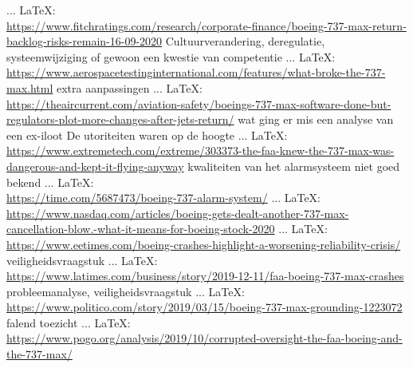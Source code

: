{{\cite{reenberg787flaws}
 ... \LaTeX:\\ \url{https://www.fitchratings.com/research/corporate-finance/boeing-737-max-return-backlog-risks-remain-16-09-2020}
\cite{fitch16092020737backlogrisks}
Cultuurverandering, deregulatie, systeemwijziging of gewoon een kwestie van competentie
 ... \LaTeX:\\ \url{https://www.aerospacetestinginternational.com/features/what-broke-the-737-max.html}
\cite{willis27082020737maxfailures}
extra aanpassingen
 ... \LaTeX:\\ \url{https://theaircurrent.com/aviation-safety/boeings-737-max-software-done-but-regulators-plot-more-changes-after-jets-return/}
\cite{ostrower11062020more737changes}
wat ging er mis een analyse van een ex-iloot
De utoriteiten waren op de hoogte
 ... \LaTeX:\\ \url{https://www.extremetech.com/extreme/303373-the-faa-knew-the-737-max-was-dangerous-and-kept-it-flying-anyway}
\cite{hruska13122019faaknown737crashrate}
kwaliteiten van het alarmsysteem niet goed bekend
 ... \LaTeX:\\ \url{https://time.com/5687473/boeing-737-alarm-system/}
\cite{bloomberg26092019failedpred}
 ... \LaTeX:\\ \url{https://www.nasdaq.com/articles/boeing-gets-dealt-another-737-max-cancellation-blow.-what-it-means-for-boeing-stock-2020}
\cite{whiteman09072020boengcancelstock}
 ... \LaTeX:\\ \url{https://www.eetimes.com/boeing-crashes-highlight-a-worsening-reliability-crisis/}
\cite{leopold09192019boeingreliability}
veiligheidsvraagstuk
 ... \LaTeX:\\ \url{https://www.latimes.com/business/story/2019-12-11/faa-boeing-737-max-crashes}
\cite{koenig11122019737crashesnofix}
probleemanalyse, veiligheidsvraagstuk
 ... \LaTeX:\\ \url{https://www.politico.com/story/2019/03/15/boeing-737-max-grounding-1223072}
\cite{dohertylindeman15032019737problems}
falend toezicht
 ... \LaTeX:\\ \url{https://www.pogo.org/analysis/2019/10/corrupted-oversight-the-faa-boeing-and-the-737-max/}
}}
